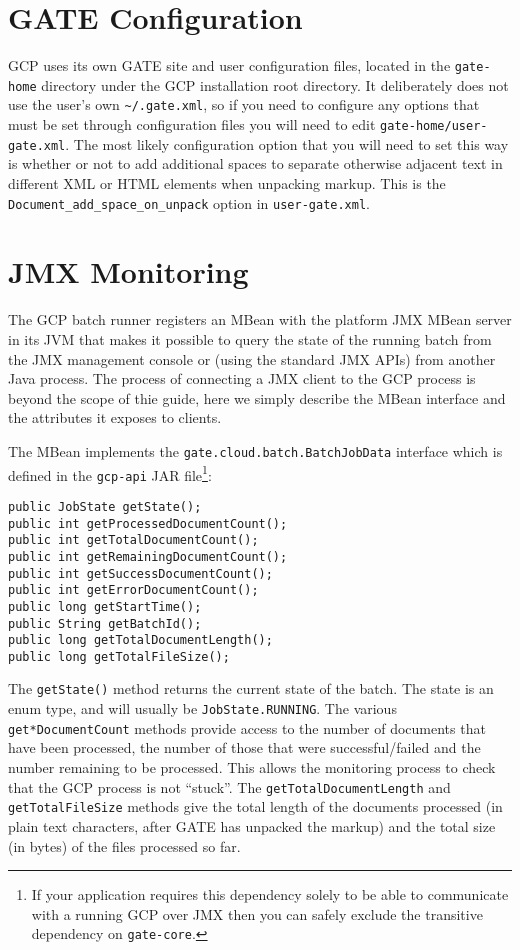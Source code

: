 \section{GATE Configuration}

GCP uses its own GATE site and user configuration files, located in the
\verb!gate-home! directory under the GCP installation root directory.  It
deliberately does not use the user's own \verb!~/.gate.xml!, so if you need to
configure any options that must be set through configuration files you will
need to edit \verb!gate-home/user-gate.xml!.  The most likely configuration
option that you will need to set this way is whether or not to add additional
spaces to separate otherwise adjacent text in different XML or HTML elements
when unpacking markup.  This is the \verb!Document_add_space_on_unpack! option
in \verb!user-gate.xml!.

\section{JMX Monitoring}

The GCP batch runner registers an MBean with the platform JMX MBean server in
its JVM that makes it possible to query the state of the running batch from the
JMX management console or (using the standard JMX APIs) from another Java
process.  The process of connecting a JMX client to the GCP process is beyond
the scope of thie guide, here we simply describe the MBean interface and the
attributes it exposes to clients.

The MBean implements the \verb!gate.cloud.batch.BatchJobData! interface which
is defined in the \verb!gcp-api! JAR file\footnote{If your application requires
this dependency solely to be able to communicate with a running GCP over JMX then
you can safely exclude the transitive dependency on \texttt{gate-core}.}:

\begin{lstlisting}[breaklines]
public JobState getState();
public int getProcessedDocumentCount();
public int getTotalDocumentCount();
public int getRemainingDocumentCount();
public int getSuccessDocumentCount();
public int getErrorDocumentCount();
public long getStartTime();
public String getBatchId();
public long getTotalDocumentLength();
public long getTotalFileSize();
\end{lstlisting}

The \verb!getState()! method returns the current state of the batch.  The state
is an enum type, and will usually be \verb!JobState.RUNNING!.  The various
\verb!get*DocumentCount! methods provide access to the number of documents that
have been processed, the number of those that were successful/failed and the
number remaining to be processed.  This allows the monitoring process to check
that the GCP process is not ``stuck''.  The \verb!getTotalDocumentLength! and
\verb!getTotalFileSize! methods give the total length of the documents
processed (in plain text characters, after GATE has unpacked the markup) and
the total size (in bytes) of the files processed so far.


